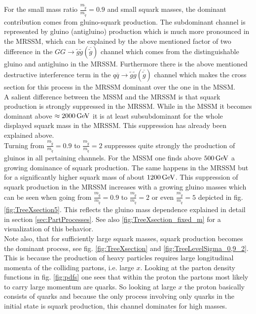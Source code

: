 For the small mass ratio $\frac{m_{\tilde{g}}}{m_{\tilde{q}}} = 0.9$ and small squark masses, the dominant contribution comes from gluino-squark production.
The subdominant channel is represented by gluino (antigluino) production which is much more pronounced in the MRSSM, which can be explained by the above mentioned factor of two difference in the $GG \to \tilde{g}\tilde{g}(\overline{\tilde{g}})$ channel which comes from the distinguishable gluino and antigluino in the MRSSM. Furthermore there is the above mentioned destructive interference term in the $q\overline{q} \to \tilde{g}\tilde{g}(\overline{\tilde{g}})$ channel which makes the cross section for this process in the MRSSM dominant over the one in the MSSM.\\
A salient difference between the MSSM and the MRSSM is that squark production is strongly suppressed in the MRSSM. While in the MSSM it becomes dominant above  $\approx \unit[2000]{GeV}$ it is at least subsubdominant for the whole displayed squark mass in the MRSSM. This suppression has already been explained above.\\
Turning from $\frac{m_{\tilde{g}}}{m_{\tilde{q}}} = 0.9$ to $\frac{m_{\tilde{g}}}{m_{\tilde{q}}} = 2$ suppresses quite strongly the production of gluinos in all pertaining channels. For the MSSM one finds above $\unit[500]{GeV}$ a growing dominance of squark production. The same happens in the MRSSM but for a significantly higher squark mass of about $\unit[1200]{GeV}$. This suppression of squark production in the MRSSM increases with a growing gluino masses which can be seen when going from $\frac{m_{\tilde{g}}}{m_{\tilde{q}}} = 0.9$ to  $\frac{m_{\tilde{g}}}{m_{\tilde{q}}} = 2$ or even $\frac{m_{\tilde{g}}}{m_{\tilde{q}}} = 5$ depicted in fig. \ref{fig:TreeXsection5}. This reflects the gluino mass dependence explained in detail in section \ref{sec:PartProcesses}. See also \ref{fig:TreeXsection_fixed_m} for a visualization of this behavior.\\
Note also, that for sufficiently large squark masses, squark production becomes the dominant process, see fig. \ref{fig:TreeXsection} and \ref{fig:TreeLevelSigma_0,9_2}. This is because the production of heavy particles requires large longitudinal momenta of the colliding partons, i.e. large $x$. Looking at the parton density functions in fig. \ref{fig:pdfs} one sees that within the proton the partons most likely to carry large momentum are quarks. So looking at large $x$ the proton basically consists of quarks and because the only process involving only quarks in the initial state is squark production, this channel dominates for high masses.\\
